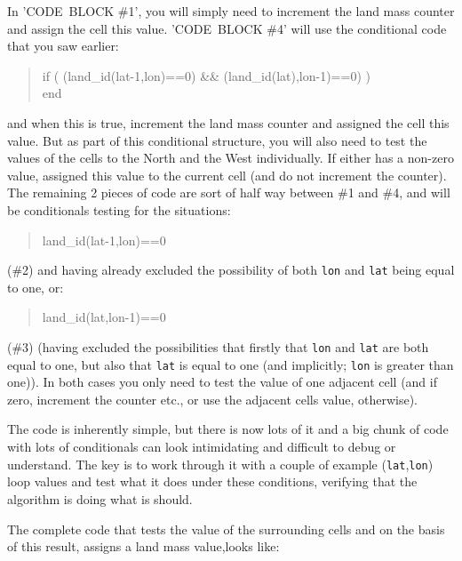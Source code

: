 \documentclass{tufte-book} %
\newenvironment{docspec}{\begin{quotation}\ttfamily\parskip0pt\parindent0pt\ignorespaces}{\end{quotation}}
\begin{document}
In 'CODE\ BLOCK \#1', you will simply need to increment the land mass counter and assign the cell this value. 'CODE\ BLOCK \#4' will use the conditional code that you saw earlier:
\begin{docspec}
if ( (land\_id(lat-1,lon)==0) \&\& (land\_id(lat),lon-1)==0) )
\\end
\end{docspec}
and when this is true, increment the land mass counter and assigned the cell this value. But as part of this conditional structure, you will also need to test the values of the cells to the North and the West individually. If either has a non-zero value, assigned this value to the current cell (and do not increment the counter). \\  The remaining 2 pieces of code are sort of half way between \#1 and \#4, and will be conditionals testing for the situations:
\begin{docspec}
land\_id(lat-1,lon)==0
\end{docspec}
(\#2) and having already excluded the possibility of both \texttt{lon} and \texttt{lat} being equal to one, or:
\begin{docspec}
land\_id(lat,lon-1)==0
\end{docspec}
(\#3) (having excluded the possibilities that firstly that  \texttt{lon} and \texttt{lat} are both equal to one, but also that \texttt{lat} is equal to one (and implicitly; \texttt{lon} is greater than one)).
In both cases you only need to test the value of one adjacent cell (and if zero, increment the counter etc., or use the adjacent cells value, otherwise).

The code is inherently simple, but there is now lots of it and a big chunk of code with lots of conditionals can look intimidating and difficult to debug or understand. The key is to work through it with a couple of example (\texttt{lat},\texttt{lon}) loop values and test what it does under these conditions, verifying that the algorithm is doing what is should.

The complete code that tests the value of the surrounding cells and  on the basis of this result, assigns a land mass value,looks like:
\end{document}
